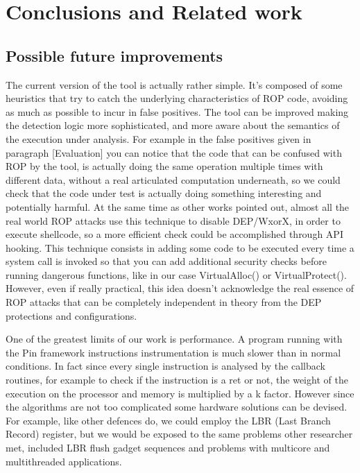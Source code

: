 \documentclass[Lau,binding=0.6cm]{sapthesis}
\begin{document}
\chapter{Conclusions and Related work}

\section{Possible future improvements}

The current version of the tool is actually rather simple. It’s composed of some heuristics that try to catch the underlying characteristics of ROP code, avoiding as much as possible to incur in false positives. The tool can be improved making the detection logic more sophisticated, and more aware about the semantics of the execution under analysis. For example in the false positives given in paragraph [Evaluation] you can notice that the code that can be confused with ROP by the tool, is actually doing the same operation multiple times with different data, without a real articulated computation underneath, so we could check that the code under test is actually doing something interesting and potentially harmful. At the same time as other works pointed out, almost all the real world ROP attacks use this technique to disable DEP/WxorX, in order to execute shellcode, so a more efficient check could be accomplished through API hooking. This technique consists in adding some code to be executed every time a system call is invoked so that you can add additional security checks before running dangerous functions, like in our case VirtualAlloc() or VirtualProtect(). However, even if really practical, this idea doesn’t acknowledge the real essence of ROP attacks that can be completely independent in theory from the DEP protections and configurations.


One of the greatest limits of our work is performance. A program running with the Pin framework instructions instrumentation is much slower than in normal conditions. In fact since every single instruction is analysed by the callback routines, for example to check if the instruction is a ret or not, the weight of the execution on the processor and memory is multiplied by a k factor. However since the algorithms are not too complicated some hardware solutions can be devised. For example, like other defences do, we could employ the LBR (Last Branch Record) register, but we would be exposed to the same problems other researcher met, included LBR flush gadget sequences and problems with multicore and multithreaded applications.

\backmatter
\end{document}
